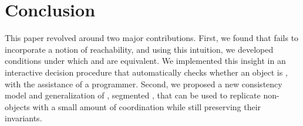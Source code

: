 \section{Conclusion}
This paper revolved around two major contributions.
%
First,
we found that \invariantclosure{} fails to incorporate a notion of
reachability, and using this intuition, we developed conditions under which
\invariantclosure{} and \invariantconfluence{} are equivalent. We implemented
this insight in an interactive \invariantconfluence{} decision procedure
that automatically checks whether an object is \invariantconfluent{}, with the
assistance of a programmer.
%
Second, we proposed a new consistency model and generalization of
\invariantconfluence{}, segmented \invariantconfluence{}, that can be used to
replicate non-\invariantconfluent{} objects with a small amount of coordination
while still preserving their invariants.

